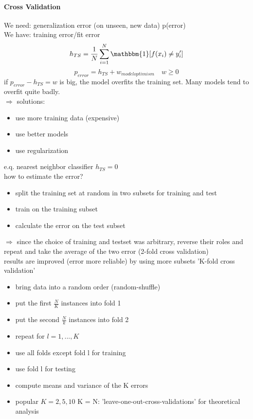 \documentclass[11pt]{article}
\begin{document}
        \paragraph{Cross Validation}
          We need: generalization error (on unseen, new data) p(error) \\
          We have: training error/fit error
          \begin{equation*}
            h_{TS} = \frac{1}{N} \sum_{i=1}^{N} \mathbbm{1}[f(x_{i}) \neq y_{i}']
          \end{equation*}
          \begin{equation*}
            p_{error} = h_{TS} + w_{model optimism} \quad w \geq 0
          \end{equation*}
          if $p_{error} - h_{TS} = w$ is big, the model overfits the training set.
          Many models tend to overfit quite badly. \\
          $\Rightarrow$ solutions: \begin{itemize}
            \item use more training data (expensive)
            \item use better models
            \item use regularization
          \end{itemize}
          e.q. nearest neighbor classifier $h_{TS}=0$ \\
          how to estimate the error?
          \begin{itemize}
            \item split the training set at random in two subsets for training
            and test
            \item train on the training subset
            \item calculate the error on the test subset
          \end{itemize}
          $\Rightarrow$ since the choice of training and testset was arbitrary,
          reverse their roles and repeat and take the average of the two error
          (2-fold cross validation) \\
          results are improved (error more reliable) by using more subsets
          'K-fold cross validation'
          \begin{itemize}
            \item bring data into a random order (random-shuffle)
            \item put the first $\frac{N}{K}$ instances into fold 1
            \item put the second $\frac{N}{k}$ instances into fold 2
            \item repeat for $l = 1,...,K$
            \item use all folds except fold l for training
            \item use fold l for testing
            \item compute means and variance of the K errors
            \item popular $K=2, 5, 10$ K = N: 'leave-one-out-cross-validations'
            for theoretical analysis
          \end{itemize}
\end{document}
